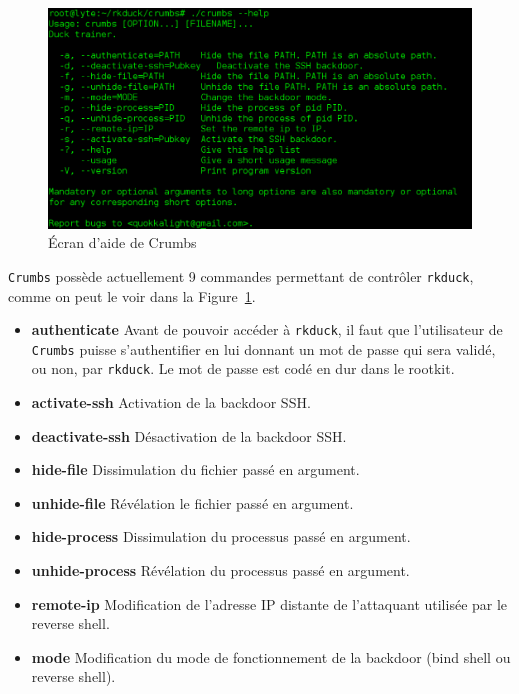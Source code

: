 \documentclass[12pt]{article}
\begin{document}
        \begin{figure}[H] 
        \begin{center}
        \includegraphics[scale=0.5]{./img/crumbs-help.png}

        \caption[dsfsdf]{Écran d'aide de Crumbs}
        \label{figure:5}
        \end{center}
        \end{figure}

        \texttt{Crumbs} possède actuellement 9 commandes permettant de contrôler \texttt{rkduck}, comme on peut le voir dans la Figure~\ref{figure:5}.
        \begin{itemize}
            \item \textbf{authenticate} Avant de pouvoir accéder à \texttt{rkduck}, il faut que l'utilisateur de \texttt{Crumbs} puisse s'authentifier en lui donnant un mot de passe qui sera validé, ou non, par \texttt{rkduck}. Le mot de passe est codé en dur dans le rootkit.
            \item \textbf{activate-ssh} Activation de la backdoor SSH. 
            \item \textbf{deactivate-ssh} Désactivation de la backdoor SSH.
            \item \textbf{hide-file} Dissimulation du fichier passé en argument.
            \item \textbf{unhide-file} Révélation le fichier passé en argument.
            \item \textbf{hide-process} Dissimulation du processus passé en argument.
            \item \textbf{unhide-process} Révélation du processus passé en argument.
            \item \textbf{remote-ip} Modification de l'adresse IP distante de l'attaquant utilisée par le reverse shell.
            \item \textbf{mode} Modification du mode de fonctionnement de la backdoor (bind shell ou reverse shell).
        \end{itemize}
        
\end{document}
